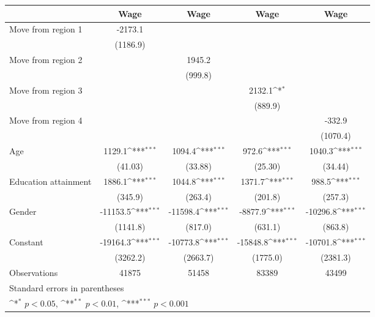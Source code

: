 {
\def\sym#1{\ifmmode^{#1}\else\(^{#1}\)\fi}
\begin{tabular*}{\textwidth}{@{\hskip\tabcolsep\extracolsep\fill}l*{4}{c}}
\toprule
                    &\multicolumn{1}{c}{Wage}&\multicolumn{1}{c}{Wage}&\multicolumn{1}{c}{Wage}&\multicolumn{1}{c}{Wage}\\
\midrule
Move from region 1  &     -2173.1         &                     &                     &                     \\
                    &    (1186.9)         &                     &                     &                     \\
\addlinespace
Move from region 2  &                     &      1945.2         &                     &                     \\
                    &                     &     (999.8)         &                     &                     \\
\addlinespace
Move from region 3  &                     &                     &      2132.1\sym{*}  &                     \\
                    &                     &                     &     (889.9)         &                     \\
\addlinespace
Move from region 4  &                     &                     &                     &      -332.9         \\
                    &                     &                     &                     &    (1070.4)         \\
\addlinespace
Age                 &      1129.1\sym{***}&      1094.4\sym{***}&       972.6\sym{***}&      1040.3\sym{***}\\
                    &     (41.03)         &     (33.88)         &     (25.30)         &     (34.44)         \\
\addlinespace
Education attainment&      1886.1\sym{***}&      1044.8\sym{***}&      1371.7\sym{***}&       988.5\sym{***}\\
                    &     (345.9)         &     (263.4)         &     (201.8)         &     (257.3)         \\
\addlinespace
Gender              &    -11153.5\sym{***}&    -11598.4\sym{***}&     -8877.9\sym{***}&    -10296.8\sym{***}\\
                    &    (1141.8)         &     (817.0)         &     (631.1)         &     (863.8)         \\
\addlinespace
Constant            &    -19164.3\sym{***}&    -10773.8\sym{***}&    -15848.8\sym{***}&    -10701.8\sym{***}\\
                    &    (3262.2)         &    (2663.7)         &    (1775.0)         &    (2381.3)         \\
\midrule
Observations        &       41875         &       51458         &       83389         &       43499         \\
\bottomrule
\multicolumn{5}{l}{\footnotesize Standard errors in parentheses}\\
\multicolumn{5}{l}{\footnotesize \sym{*} \(p<0.05\), \sym{**} \(p<0.01\), \sym{***} \(p<0.001\)}\\
\end{tabular*}
}
